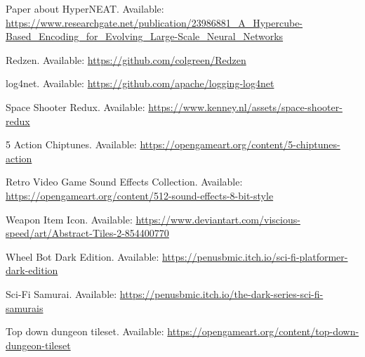 \begin{thebibliography}{1}
     Paper about HyperNEAT. Available: \url{https://www.researchgate.net/publication/23986881_A_Hypercube-Based_Encoding_for_Evolving_Large-Scale_Neural_Networks}

     Redzen. Available: \url{https://github.com/colgreen/Redzen}

     log4net. Available: \url{https://github.com/apache/logging-log4net}

     Space Shooter Redux. Available: \url{https://www.kenney.nl/assets/space-shooter-redux}

     5 Action Chiptunes. Available: \url{https://opengameart.org/content/5-chiptunes-action}

     Retro Video Game Sound Effects Collection. Available: \url{https://opengameart.org/content/512-sound-effects-8-bit-style}

     Weapon Item Icon. Available: \url{https://www.deviantart.com/viscious-speed/art/Abstract-Tiles-2-854400770}

     Wheel Bot Dark Edition. Available: \url{https://penusbmic.itch.io/sci-fi-platformer-dark-edition}

     Sci-Fi Samurai. Available: \url{https://penusbmic.itch.io/the-dark-series-sci-fi-samurais}

     Top down dungeon tileset. Available: \url{https://opengameart.org/content/top-down-dungeon-tileset}

\end{thebibliography}